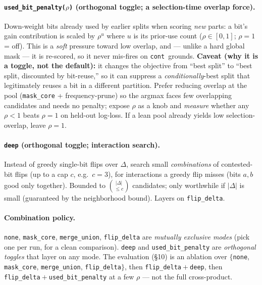 \documentclass[11pt]{article}
\newcommand{\code}[1]{\texttt{#1}}
\newcommand{\cont}{\code{cont}}
\begin{document}
\paragraph{\code{used\_bit\_penalty($\rho$)} (orthogonal toggle; a selection-time overlap force).} Down-weight bits already used by earlier splits when scoring \emph{new} parts: a bit's gain contribution is scaled by $\rho^{u}$ where $u$ is its prior-use count ($\rho\in[0,1]$; $\rho=1$ = off). This is a \emph{soft} pressure toward low overlap, and --- unlike a hard global mask --- it is re-scored, so it never mis-fires on \cont\ grounds. \textbf{Caveat (why it is a toggle, not the default):} it changes the objective from ``best split'' to ``best split, discounted by bit-reuse,'' so it can suppress a \emph{conditionally}-best split that legitimately reuses a bit in a different partition. Prefer reducing overlap at the pool (\code{mask\_core} + frequency-prune) so the argmax faces few overlapping candidates and needs no penalty; expose $\rho$ as a knob and \emph{measure} whether any $\rho<1$ beats $\rho=1$ on held-out log-loss. If a lean pool already yields low selection-overlap, leave $\rho=1$.

\paragraph{\code{deep} (orthogonal toggle; interaction search).} Instead of greedy single-bit flips over $\Delta$, search small \emph{combinations} of contested-bit flips (up to a cap $c$, e.g.\ $c=3$), for interactions a greedy flip misses (bits $a,b$ good only together). Bounded to $\binom{|\Delta|}{\le c}$ candidates; only worthwhile if $|\Delta|$ is small (guaranteed by the neighborhood bound). Layers on \code{flip\_delta}.

\paragraph{Combination policy.} \code{none}, \code{mask\_core}, \code{merge\_union}, \code{flip\_delta} are \emph{mutually exclusive modes} (pick one per run, for a clean comparison). \code{deep} and \code{used\_bit\_penalty} are \emph{orthogonal toggles} that layer on any mode. The evaluation (\S10) is an ablation over $\{$\code{none}, \code{mask\_core}, \code{merge\_union}, \code{flip\_delta}$\}$, then \code{flip\_delta}${}+{}$\code{deep}, then \code{flip\_delta}${}+{}$\code{used\_bit\_penalty} at a few $\rho$ --- not the full cross-product.
\end{document}
